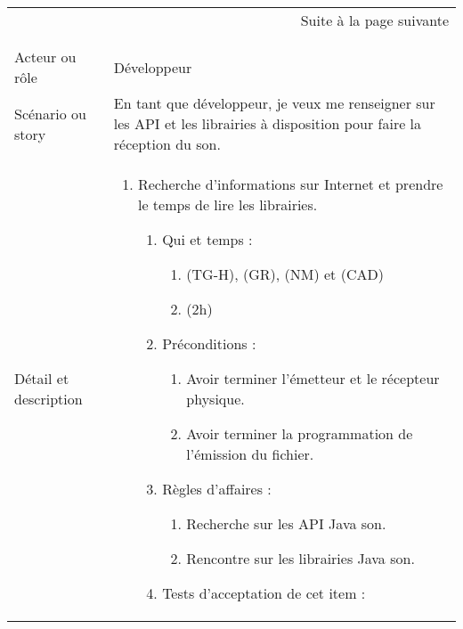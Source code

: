 \begin{longtable}{|l|p{}|}
\multicolumn{2}{r}{Suite à la page suivante} \\
\endfoot

\multicolumn{2}{r}{} \\
\endlastfoot

\hline
    \rowcolor{Gray}
    \multicolumn{2}{|l|}{1} \\
\hline
    Acteur ou rôle & Développeur  \\
\hline
    Scénario ou story & En tant que développeur, je veux me renseigner sur les API et les librairies à disposition pour faire la réception du son. \\
\hline
    Détail et description &
        \begin{enumerate}[label*=\arabic*.]
       \item Recherche d'informations sur Internet et prendre le temps de lire les librairies.
            \begin{enumerate}[label*=\arabic*.]
                    \item Qui et temps :
                    \begin{enumerate}[label*=\arabic*.]
                        \item (TG-H), (GR), (NM) et (CAD)
                        \item (2h)
                    \end{enumerate}
                    \item Préconditions :
                    \begin{enumerate}[label*=\arabic*.]
                    \item Avoir terminer l'émetteur et le récepteur physique.
                     \item Avoir terminer la programmation de l'émission du fichier.
                    \end{enumerate}
                    \item Règles d’affaires :
                    \begin{enumerate}[label*=\arabic*.]
                        \item Recherche sur les API Java son.
                        \item Rencontre sur les librairies Java son.
                    \end{enumerate}
                    \item Tests d'acceptation de cet item :
                    \begin{enumerate}[label*=\arabic*.]

\end{enumerate}
\end{enumerate}
\end{enumerate}
\end{longtable}
